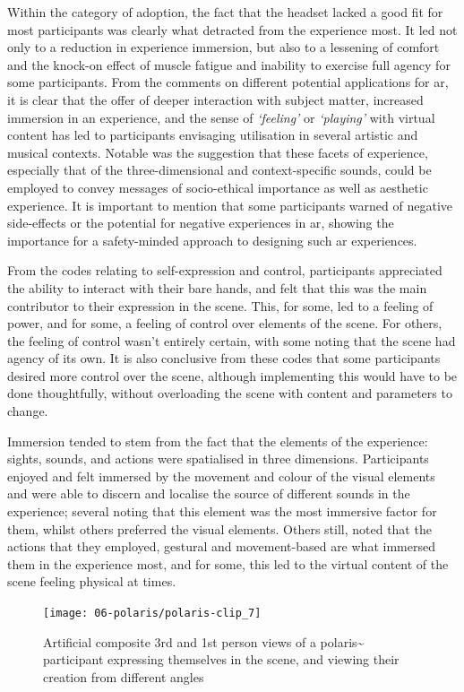 Within the category of adoption, the fact that the headset lacked a good fit for most participants was clearly what detracted from the experience most. It led not only to a reduction in experience immersion, but also to a lessening of comfort and the knock-on effect of muscle fatigue and inability to exercise full agency for some participants. From the comments on different potential applications for \ac{ar}, it is clear that the offer of deeper interaction with subject matter, increased immersion in an experience, and the sense of \textit{`feeling'} or \textit{`playing'} with virtual content has led to participants envisaging  utilisation in several artistic and musical contexts. Notable was the suggestion that these facets of experience, especially that of the three-dimensional and context-specific sounds, could be employed to convey messages of socio-ethical importance as well as aesthetic experience. It is important to mention that some participants warned of negative side-effects or the potential for negative experiences in \ac{ar}, showing the importance for a safety-minded approach to designing such \ac{ar} experiences.

From the codes relating to self-expression and control, participants appreciated the ability to interact with their bare hands, and felt that this was the main contributor to their expression in the scene. This, for some, led to a feeling of power, and for some, a feeling of control over elements of the scene. For others, the feeling of control wasn't entirely certain, with some noting that the scene had agency of its own. It is also conclusive from these codes that some participants desired more control over the scene, although implementing this would have to be done thoughtfully, without overloading the scene with content and parameters to change.

Immersion tended to stem from the fact that the elements of the experience: sights, sounds, and actions were spatialised in three dimensions. Participants enjoyed and felt immersed by the movement and colour of the visual elements and were able to discern and localise the source of different sounds in the experience; several noting that this element was the most immersive factor for them, whilst others preferred the visual elements. Others still, noted that the actions that they employed, gestural and movement-based are what immersed them in the experience most, and for some, this led to the virtual content of the scene feeling physical at times.

\begin{figure}[ht]
    \centering
    \texttt{[image: 06-polaris/polaris-clip\_7]}
    \captionsetup{justification=centering,margin=1.5cm}
    \caption{Artificial composite 3rd and 1st person views of a polaris\textasciitilde{} participant expressing themselves in the scene, and viewing their creation from different angles \citep[from][\href{https://youtu.be/H8d3n7eNKAg}{at 0:00}]{bilbow2022}}\label{fig: polaris-clip_7}
\end{figure}

